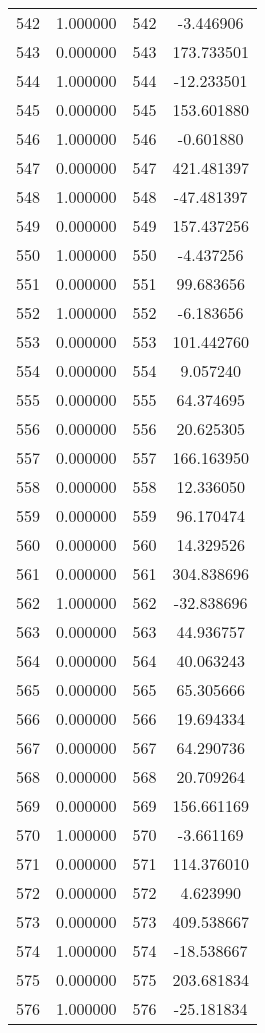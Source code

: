 \documentclass[12pt]{article}
\begin{document}
\begin{longtable}{@{}cccc@{}}
542 & 1.000000 & 542 & -3.446906 \\
543 & 0.000000 & 543 & 173.733501 \\
544 & 1.000000 & 544 & -12.233501 \\
545 & 0.000000 & 545 & 153.601880 \\
546 & 1.000000 & 546 & -0.601880 \\
547 & 0.000000 & 547 & 421.481397 \\
548 & 1.000000 & 548 & -47.481397 \\
549 & 0.000000 & 549 & 157.437256 \\
550 & 1.000000 & 550 & -4.437256 \\
551 & 0.000000 & 551 & 99.683656 \\
552 & 1.000000 & 552 & -6.183656 \\
553 & 0.000000 & 553 & 101.442760 \\
554 & 0.000000 & 554 & 9.057240 \\
555 & 0.000000 & 555 & 64.374695 \\
556 & 0.000000 & 556 & 20.625305 \\
557 & 0.000000 & 557 & 166.163950 \\
558 & 0.000000 & 558 & 12.336050 \\
559 & 0.000000 & 559 & 96.170474 \\
560 & 0.000000 & 560 & 14.329526 \\
561 & 0.000000 & 561 & 304.838696 \\
562 & 1.000000 & 562 & -32.838696 \\
563 & 0.000000 & 563 & 44.936757 \\
564 & 0.000000 & 564 & 40.063243 \\
565 & 0.000000 & 565 & 65.305666 \\
566 & 0.000000 & 566 & 19.694334 \\
567 & 0.000000 & 567 & 64.290736 \\
568 & 0.000000 & 568 & 20.709264 \\
569 & 0.000000 & 569 & 156.661169 \\
570 & 1.000000 & 570 & -3.661169 \\
571 & 0.000000 & 571 & 114.376010 \\
572 & 0.000000 & 572 & 4.623990 \\
573 & 0.000000 & 573 & 409.538667 \\
574 & 1.000000 & 574 & -18.538667 \\
575 & 0.000000 & 575 & 203.681834 \\
576 & 1.000000 & 576 & -25.181834 \\

\end{longtable}
\end{document}
